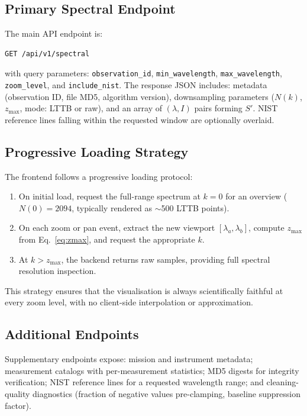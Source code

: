 \documentclass[a4paper,twocolumn,10pt]{article}
\begin{document}
\subsection{Primary Spectral Endpoint}

The main API endpoint is:

\begin{verbatim}
GET /api/v1/spectral
\end{verbatim}

with query parameters: \texttt{observation\_id},
\texttt{min\_wavelength}, \texttt{max\_wavelength},
\texttt{zoom\_level}, and \texttt{include\_nist}.  The response JSON
includes: metadata (observation ID, file MD5, algorithm version),
downsampling parameters ($N(k)$, $z_{\max}$, mode: LTTB or raw), and
an array of $(\lambda, I)$ pairs forming $S'$.  NIST reference lines
falling within the requested window are optionally overlaid.

\subsection{Progressive Loading Strategy}

The frontend follows a progressive loading protocol:
\begin{enumerate}[nosep,leftmargin=*]
  \item On initial load, request the full-range spectrum at $k = 0$
    for an overview ($N(0) = 2094$, typically rendered as
    $\sim$500 LTTB points).
  \item On each zoom or pan event, extract the new viewport
    $[\lambda_a, \lambda_b]$, compute $z_{\max}$ from
    Eq.~\eqref{eq:zmax}, and request the appropriate $k$.
  \item At $k > z_{\max}$, the backend returns raw samples,
    providing full spectral resolution inspection.
\end{enumerate}

This strategy ensures that the visualisation is always scientifically
faithful at every zoom level, with no client-side interpolation or
approximation.

\subsection{Additional Endpoints}

Supplementary endpoints expose: mission and instrument metadata;
measurement catalogs with per-measurement statistics; MD5 digests for
integrity verification; NIST reference lines for a requested
wavelength range; and cleaning-quality diagnostics (fraction of
negative values pre-clamping, baseline suppression factor).
\end{document}
